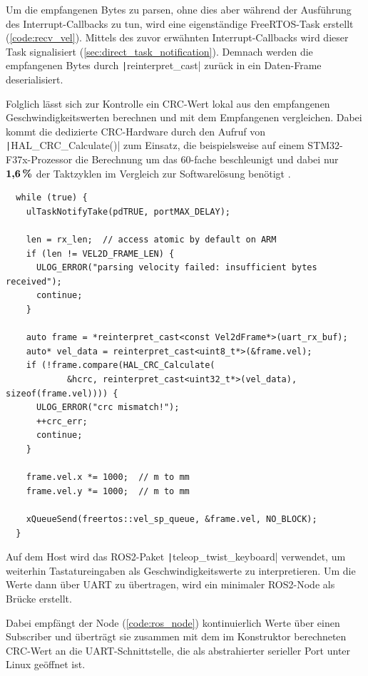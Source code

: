 Um die empfangenen Bytes zu parsen, ohne dies aber während der Ausführung des
Interrupt-Callbacks zu tun, wird eine eigenständige FreeRTOS-Task erstellt
(\ref{code:recv_vel}). Mittels des zuvor erwähnten Interrupt-Callbacks wird
dieser Task signalisiert (\ref{sec:direct_task_notification}). Demnach werden
die empfangenen Bytes durch \texttt|reinterpret_cast| zurück in ein
Daten-Frame deserialisiert.

Folglich lässt sich zur Kontrolle ein CRC-Wert lokal aus den empfangenen
Geschwindigkeitswerten berechnen und mit dem Empfangenen vergleichen. Dabei
kommt die dedizierte CRC-Hardware durch den Aufruf von
\texttt|HAL_CRC_Calculate()| zum Einsatz, die beispielsweise auf einem
STM32-F37x-Prozessor die Berechnung um das 60-fache beschleunigt und dabei nur
$\textbf{1,6\,\%}$ der Taktzyklen im Vergleich zur Softwarelösung benötigt
\cite[S. 9]{AN4187}.

\begin{code}
\begin{verbatim}
  while (true) {
    ulTaskNotifyTake(pdTRUE, portMAX_DELAY);

    len = rx_len;  // access atomic by default on ARM
    if (len != VEL2D_FRAME_LEN) {
      ULOG_ERROR("parsing velocity failed: insufficient bytes received");
      continue;
    }

    auto frame = *reinterpret_cast<const Vel2dFrame*>(uart_rx_buf);
    auto* vel_data = reinterpret_cast<uint8_t*>(&frame.vel);
    if (!frame.compare(HAL_CRC_Calculate(
            &hcrc, reinterpret_cast<uint32_t*>(vel_data), sizeof(frame.vel)))) {
      ULOG_ERROR("crc mismatch!");
      ++crc_err;
      continue;
    }

    frame.vel.x *= 1000;  // m to mm
    frame.vel.y *= 1000;  // m to mm

    xQueueSend(freertos::vel_sp_queue, &frame.vel, NO_BLOCK);
  }
\end{verbatim}
    \label{code:recv_vel}
\end{code}

Auf dem Host wird das ROS2-Paket \texttt|teleop_twist_keyboard|
verwendet, um weiterhin Tastatureingaben als Geschwindigkeitswerte zu
interpretieren. Um die Werte dann über UART zu übertragen, wird ein minimaler
ROS2-Node als Brücke erstellt.

Dabei empfängt der Node (\ref{code:ros_node}) kontinuierlich Werte über einen
Subscriber und überträgt sie zusammen mit dem im Konstruktor berechneten
CRC-Wert an die UART-Schnittstelle, die als abstrahierter serieller Port unter
Linux geöffnet ist.

